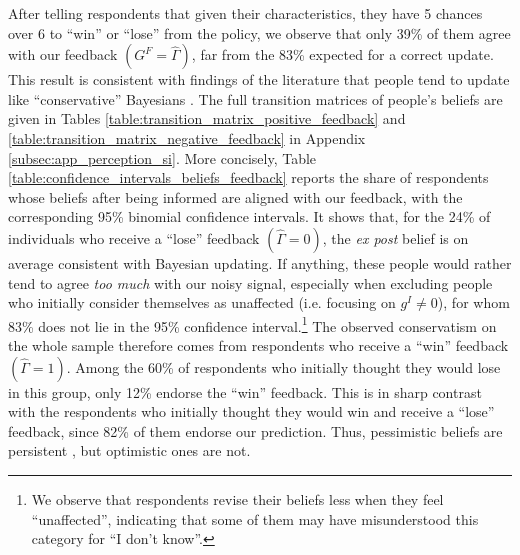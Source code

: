 \documentclass[12pt]{article} %
\providecommand{\DIFaddtex}[1]{{\protect\color{blue}\uwave{#1}}} %
\providecommand{\DIFaddbegin}{} %
\providecommand{\DIFaddend}{} %
\providecommand{\DIFadd}[1]{\texorpdfstring{\DIFaddtex{#1}}{#1}} %
\newcommand{\DIFaddincludegraphics}[2][]{{\color{blue}\fbox{\DIFOincludegraphics[#1]{#2}}}} %
\DeclareRobustCommand{\DIFaddbegin}{\DIFOaddbegin \let\includegraphics\DIFaddincludegraphics} %
\DeclareRobustCommand{\DIFaddend}{\DIFOaddend \let\includegraphics\DIFOincludegraphics} %
\begin{document}
After telling respondents that given their characteristics, they have 5 chances over 6 to ``win'' or ``lose'' from the policy, we observe that only 39\% of them agree with our feedback $(G^F = \widehat{\Gamma})$, far from the 83\% expected for a correct update. This result is consistent with findings of the literature that people tend to update like ``conservative'' Bayesians \citep{edwards_conservatism_1968}. The full transition matrices of people's beliefs are given in Tables \ref{table:transition_matrix_positive_feedback} and \ref{table:transition_matrix_negative_feedback} in Appendix \ref{subsec:app_perception_si}. More concisely, Table \ref{table:confidence_intervals_beliefs_feedback} reports the share of respondents whose beliefs after being informed are aligned with our feedback, with the corresponding 95\% binomial confidence intervals. It shows that, for the 24\% of individuals who receive a ``lose'' feedback $(\widehat{\Gamma} = 0)$, the \textit{ex post} belief is on average consistent with Bayesian updating. If anything, these people would rather tend to agree \textit{too much} with our noisy signal, especially when excluding people who initially consider themselves as unaffected (i.e. focusing on $g^I \neq 0$), for whom 83\% does not lie in the 95\% confidence interval.\footnote{We observe that respondents revise their beliefs less when they feel ``unaffected'', indicating that some of them may have misunderstood this category for ``I don't know''.} The observed conservatism on the whole sample therefore comes from respondents who receive a ``win'' feedback $(\widehat{\Gamma} = 1)$. Among the 60\% of respondents who initially thought they would lose in this group, only 12\% endorse the ``win'' feedback. This is in sharp contrast with the respondents who initially thought they would win and receive a ``lose'' feedback, since 82\% of them endorse our prediction. Thus, pessimistic beliefs are persistent \DIFaddbegin \DIFadd{to our treatment}\DIFaddend , but optimistic ones are not.
\end{document}
